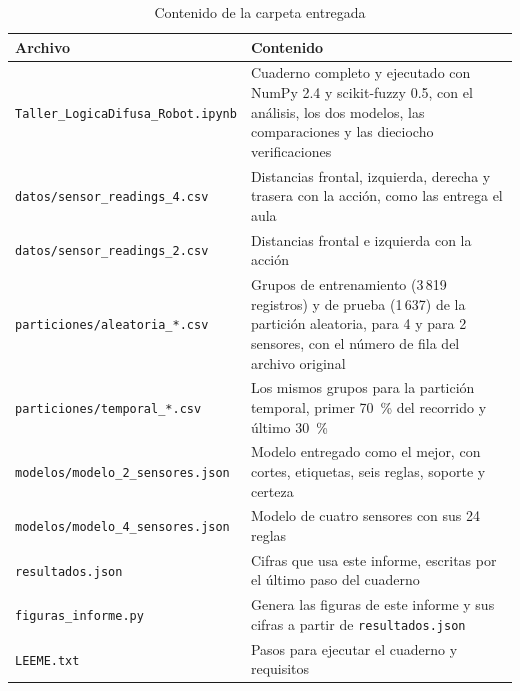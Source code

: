 \documentclass[11pt,letterpaper]{article}
\begin{document}
\begin{table}[!htb]
    \centering
    \caption{Contenido de la carpeta entregada}
    \label{tab:archivos}
    \footnotesize
    \begin{tabular}{>{\raggedright\arraybackslash}p{5.6cm} >{\raggedright\arraybackslash}p{9.4cm}}
        \toprule
        \textbf{Archivo} & \textbf{Contenido} \\
        \midrule
        \texttt{Taller\_LogicaDifusa\_Robot.ipynb} & Cuaderno completo y ejecutado con NumPy 2.4 y scikit-fuzzy 0.5, con el análisis, los dos modelos, las comparaciones y las dieciocho verificaciones \\
        \texttt{datos/sensor\_readings\_4.csv} & Distancias frontal, izquierda, derecha y trasera con la acción, como las entrega el aula \\
        \texttt{datos/sensor\_readings\_2.csv} & Distancias frontal e izquierda con la acción \\
        \texttt{particiones/aleatoria\_*.csv} & Grupos de entrenamiento (3\,819 registros) y de prueba (1\,637) de la partición aleatoria, para 4 y para 2 sensores, con el número de fila del archivo original \\
        \texttt{particiones/temporal\_*.csv} & Los mismos grupos para la partición temporal, primer 70~\% del recorrido y último 30~\% \\
        \texttt{modelos/modelo\_2\_sensores.json} & Modelo entregado como el mejor, con cortes, etiquetas, seis reglas, soporte y certeza \\
        \texttt{modelos/modelo\_4\_sensores.json} & Modelo de cuatro sensores con sus 24 reglas \\
        \texttt{resultados.json} & Cifras que usa este informe, escritas por el último paso del cuaderno \\
        \texttt{figuras\_informe.py} & Genera las figuras de este informe y sus cifras a partir de \texttt{resultados.json} \\
        \texttt{LEEME.txt} & Pasos para ejecutar el cuaderno y requisitos \\
        \bottomrule
    \end{tabular}
\end{table}
\end{document}
